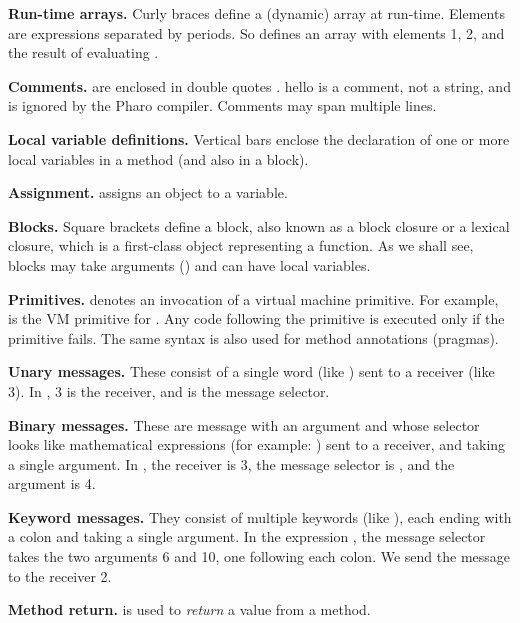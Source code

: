 \documentclass[10pt,twoside,english]{_support/latex/sbabook/sbabook}
\begin{document}
\textbf{Run-time arrays.} Curly braces \textcode{\{ \}} define a (dynamic) array at run-time.
Elements are expressions separated by periods. So  defines an
array with elements 1, 2, and the result of evaluating .

\textbf{Comments.} are enclosed in double quotes  . hello is a comment, not a
string, and is ignored by the Pharo compiler. Comments may span multiple lines.

\textbf{Local variable definitions.} Vertical bars \textcode{\textbar{} \textbar{}} enclose the declaration of
one or more local variables in a method (and also in a block).

\textbf{Assignment.} \textcode{:= } assigns an object to a variable.

\textbf{Blocks.} Square brackets \textcode{{[} {]}} define a block, also known as a block
closure or a lexical closure, which is a first-class object representing a
function. As we shall see, blocks may take arguments (\textcode{{[}:i \textbar{} ...{]}}) and can
have local variables.

\textbf{Primitives.}  denotes an invocation of a virtual
machine primitive. For example,  is the VM primitive for
. Any code following the primitive is executed only if the
primitive fails. The same syntax is also used for method annotations (pragmas).

\textbf{Unary messages.} These consist of a single word (like ) sent to a
receiver (like 3). In , 3 is the receiver, and  is
the message selector.

\textbf{Binary messages.} These are message with an argument and whose selector looks like mathematical expressions (for example: \textcode{+}) sent to a receiver, and taking a single argument. In , the receiver is 3, the
message selector is  \textcode{+}, and the argument is 4.

\textbf{Keyword messages.} They consist of multiple keywords (like ), each ending with a colon and taking a single argument. In the
expression , the message selector
 takes the two arguments 6 and 10, one following each colon.
We send the message to the receiver 2.

\textbf{Method return.} \textcode{\string^} is used to \textit{return} a value from a method.
\end{document}
